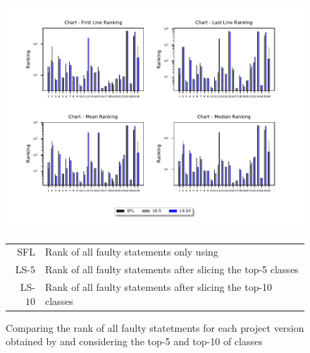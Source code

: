 \documentclass{article}
\begin{document}
\begin{appendices}
	\begin{figure}
		\centering
		\includegraphics[width=\textwidth]{figures/Chart_abs.pdf}
		\caption{Comparing the rank of all faulty statetments for each project version obtained by \sfl{} and \comb{} considering the top-5 and top-10 of classes}
		\begin{tabular}{r@{: }l}
			SFL & Rank of all faulty statements only using \sfl{}\\
			LS-$5$& Rank of all faulty statements after slicing the top-5 classes \\
			LS-$10$& Rank of all faulty statements after slicing the top-10 classes 
		\end{tabular}
		\label{fig:ranking}
	\end{figure}


\end{appendices}
\end{document}
